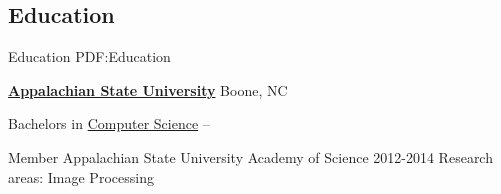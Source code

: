 \documentclass[a4paper,10pt,oneside]{article}
\begin{document}
\begin{body}

\EntryGap
\section
{Education}
{Education}
{PDF:Education}

\href{http://appstate.edu}
{\textbf{Appalachian State University}}
Boone, NC\hfill

\SmallEntryGap
Bachelors in
\href{http://cs.appstate.edu}
{Computer Science}
\hfill
{} --
\begin{detail}
\BulletItem
Member Appalachian State University Academy of Science 2012-2014
\BulletItem
Research areas:
Image Processing
\end{detail}




\end{body}
\end{document}

